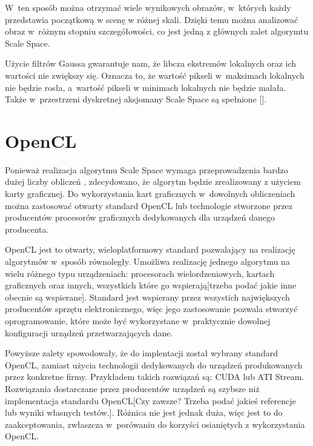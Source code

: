 W~ten sposób można otrzymać wiele wynikowych obrazów, w~których każdy przedstawia początkową w scenę w różnej skali. Dzięki temu można analizować obraz w~różnym stopniu szczegółowości, co jest jedną z głównych zalet algorymtu Scale Space.

Użycie filtrów Gaussa gwarantuje nam, że libcza ekstremów lokalnych oraz ich wartości nie zwiększy się. Oznacza to, że wartość pikseli w~maksimach lokalnych nie będzie rosła, a~wartość pikseli w minimach lokalnych nie będzie malała. Także w~przestrzeni dyskretnej aksjomany Scale Space są spełnione [\cite{SSFDS}].


\section{OpenCL}
\label{sec:OpenCL}

Ponieważ realizacja algorytmu Scale Space wymaga przeprowadzenia bardzo dużej liczby obliczeń , zdecydowano, że algorytm będzie zrealizowany z użyciem karty graficznej. Do wykorzystania kart graficznych w~dowolnych obliczeniach można zastosować otwarty standard OpenCL lub technologie stworzone przez producentów procesorów graficznych dedykowanych dla urządzeń danego producenta.

OpenCL jest to otwarty, wieloplatformowy standard pozwalający na realizację algorytmów w~sposób równoległy. Umożliwa realizację jednego algorytmu na wielu różnego typu urządzeniach: procesorach wielordzeniowych, kartach graficznych oraz innych, wszystkich które go wspierają[trzeba podać jakie inne obecnie są wspierane]. Standard jest wspierany przez wszystich największych producentów sprzętu elektronicznego, więc jego zastosowanie pozwala stworzyć oprogramowanie, które może być wykorzystane w~praktycznie dowolnej konfiguracji urządzeń przetwarzających dane.

Powyższe zalety spowodowały, że do implentacji został wybrany standard OpenCL, zamiast użycia technologii dedykowanych do urządzeń produkowanych przez konkretne firmy. Przykładem takich rozwiązań są: CUDA lub ATI Stream. Rozwiązania dostarczane przez producentów urządzeń są szybsze niż implementacja standardu OpenCL[Czy zawsze? Trzeba podać jakieś referencje lub wyniki własnych testów.]. Różnica nie jest jednak duża, więc jest to do zaakceptowania, zwłaszcza w~porówaniu do korzyści osianiętych z wykorzystania OpenCL.


